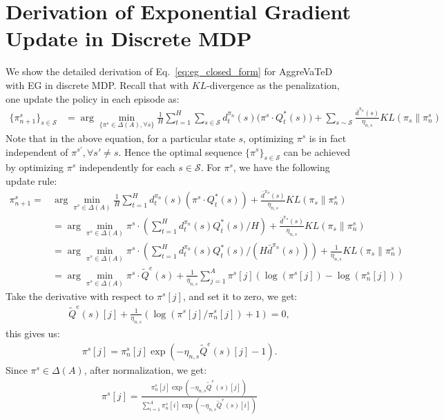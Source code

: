 \documentclass{article}
\begin{document}
\section{Derivation of Exponential Gradient Update in Discrete MDP}
\label{sec:EG_derivation}
We show the detailed derivation of Eq.~\ref{eq:eg_closed_form} for AggreVaTeD with EG in discrete MDP. Recall that with $KL$-divergence as the penalization, one update the policy in each episode as:
\begin{align}
\{\pi_{n+1}^s\}_{s\in\mathcal{S}} &= \arg\min_{\{\pi^s\in \Delta(A),\forall s\}}\frac{1}{H}\sum_{t=1}^H\sum_{s\in\mathcal{S}}d_t^{\pi_n}(s)\big( \pi^s\cdot Q_t^*(s)\big) + \sum_{s\sim\mathcal{S}}\frac{\bar{d}^{\pi_n}(s)}{\eta_{n,s}}KL(\pi_s \| \pi_n^s) \nonumber
\end{align} Note that in the above equation, for a particular state $s$, optimizing $\pi^s$ is in fact independent of $\pi^{s'}, \forall s'\neq s$. Hence the optimal sequence $\{\pi^s\}_{s\in\mathcal{S}}$ can be achieved by optimizing $\pi^s$ independently for each $s\in\mathcal{S}$. For $\pi^s$, we have the following update rule:
\begin{align}
\pi_{n+1}^s = &\arg\min_{\pi^s\in\Delta(A)}\frac{1}{H}\sum_{t=1}^H d_t^{\pi_n}(s)(\pi^s\cdot Q^*_t(s)) + \frac{\bar{d}^{\pi_n}(s)}{\eta_{n,s}}KL(\pi_s\| \pi_n^s) \nonumber\\
& = \arg\min_{\pi^s\in\Delta(A)}\pi^{s}\cdot (\sum_{t=1}^H d_t^{\pi_n}(s)Q_t^*(s) / H) + \frac{\bar{d}^{\pi_n}(s)}{\eta_{n,s}}KL(\pi_s\|\pi_n^s) \nonumber\\
& = \arg\min_{\pi^s\in\Delta(A)}\pi^{s}\cdot (\sum_{t=1}^H d_t^{\pi_n}(s)Q_t^*(s) /(H\bar{d}^{\pi_n}(s))) + \frac{1}{\eta_{n,s}}KL(\pi_s\|\pi_n^s) \nonumber\\
& = \arg\min_{\pi^s\in\Delta(A)}\pi^s\cdot \tilde{Q}^e(s) + \frac{1}{\eta_{n,s}}\sum_{j=1}^A \pi^s[j](\log(\pi^s[j]) - \log(\pi_n^s[j]))
\end{align} Take the derivative with respect to $\pi^s[j]$, and set  it to zero, we get:
\begin{align}
\tilde{Q}^e(s)[j] +\frac{1}{\eta_{n,s}}(\log(\pi^s[j]/\pi_n^s[j]) + 1) = 0,
\end{align} this gives us:
\begin{align}
\pi^s[j] = \pi_n^s[j]\exp(-\eta_{n,s}\tilde{Q}^e(s)[j]-1).
\end{align} Since $\pi^s\in\Delta(A)$, after normalization, we get:
\begin{align}
\pi^s[j] = \frac{\pi_n^s[j]\exp(-\eta_{n,s}\tilde{Q}^e(s)[j])}{\sum_{i=1}^A \pi_n^s[i]\exp(-\eta_{n,s}\tilde{Q}^e(s)[i])}
\end{align}
\end{document}
